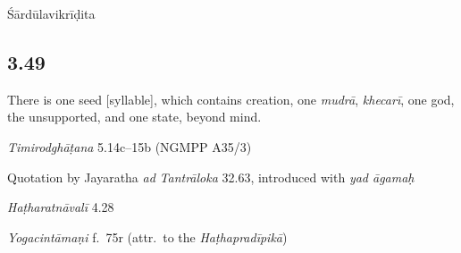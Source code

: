 \begin{ekdosis}

\begin{metre}[hp03_048]
Śārdūlavikrīḍita 
\end{metre}

\subsection*{3.49}
\begin{translation}[hp03_049]
There is one seed [syllable], which contains creation, one \emph{mudrā}, \emph{khecarī}, one god, the unsupported, and one state, beyond mind.
\end{translation}

\begin{sources}[hp03_049]
\emph{Timirodghāṭana} 5.14c–15b (NGMPP A35/3)
\begin{versinnote}
\end{versinnote}

Quotation by Jayaratha \emph{ad} \emph{Tantrāloka} 32.63, introduced with \emph{yad āgamaḥ}
\begin{versinnote}
\end{versinnote}
\end{sources}

\begin{testimonia}[hp03_049]
\emph{Haṭharatnāvalī} 4.28
\begin{versinnote}
\end{versinnote}

\emph{Yogacintāmaṇi} f.~75r (attr.~to the \emph{Haṭhapradīpikā})
\begin{versinnote}
\end{versinnote}


\end{testimonia}
\end{ekdosis}
